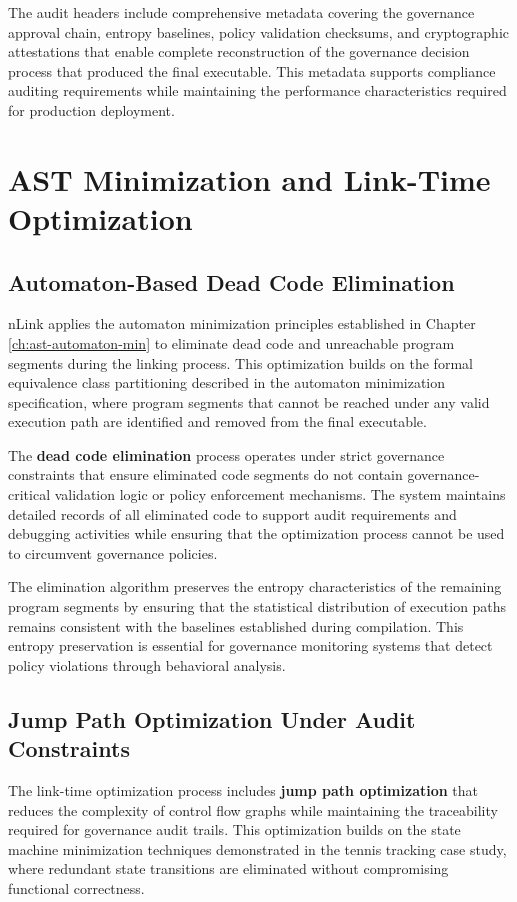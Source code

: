 The audit headers include comprehensive metadata covering the governance approval chain, entropy baselines, policy validation checksums, and cryptographic attestations that enable complete reconstruction of the governance decision process that produced the final executable. This metadata supports compliance auditing requirements while maintaining the performance characteristics required for production deployment.

\section{AST Minimization and Link-Time Optimization}

\subsection{Automaton-Based Dead Code Elimination}

nLink applies the automaton minimization principles established in Chapter \ref{ch:ast-automaton-min} to eliminate dead code and unreachable program segments during the linking process. This optimization builds on the formal equivalence class partitioning described in the automaton minimization specification, where program segments that cannot be reached under any valid execution path are identified and removed from the final executable.

The \textbf{dead code elimination} process operates under strict governance constraints that ensure eliminated code segments do not contain governance-critical validation logic or policy enforcement mechanisms. The system maintains detailed records of all eliminated code to support audit requirements and debugging activities while ensuring that the optimization process cannot be used to circumvent governance policies.

The elimination algorithm preserves the entropy characteristics of the remaining program segments by ensuring that the statistical distribution of execution paths remains consistent with the baselines established during compilation. This entropy preservation is essential for governance monitoring systems that detect policy violations through behavioral analysis.

\subsection{Jump Path Optimization Under Audit Constraints}

The link-time optimization process includes \textbf{jump path optimization} that reduces the complexity of control flow graphs while maintaining the traceability required for governance audit trails. This optimization builds on the state machine minimization techniques demonstrated in the tennis tracking case study, where redundant state transitions are eliminated without compromising functional correctness.

